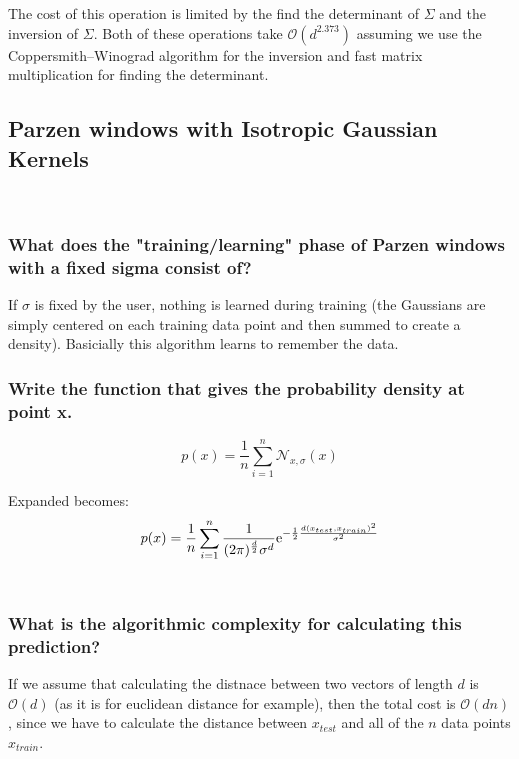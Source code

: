 \documentclass{amsart}
\theoremstyle{definition}
\theoremstyle{remark}
\numberwithin{equation}{section}
\begin{document}
The cost of this operation is limited by the find the determinant of $\Sigma$
and the inversion of $\Sigma$. Both of these operations take $\mathcal{O}(d^{2.373})$  
assuming we use the Coppersmith–Winograd algorithm for the inversion and fast
matrix multiplication for finding the determinant. \\

\subsection{Parzen windows with Isotropic Gaussian Kernels} \\

\subsubsection{What does the "training/learning" phase of Parzen windows with a
fixed sigma consist of?} 

 If $\sigma$ is fixed by the user, nothing is learned during training (the 
Gaussians are simply centered on each training data point and then summed to 
create a density). Basicially this algorithm learns to remember the data. \\

\subsubsection{Write the function that gives the probability density at point x.} 

\begin{equation}
    p(x) = \frac{1}{n}\sum_{i=1}^{n}\mathcal{N}_{x, \sigma}(x)
\end{equation}

Expanded becomes: \\

\begin{equation}
    p(x) = \frac{1}{n}\sum_{i=1}^{n} \frac{1}{(2\pi)^{\frac{d}{2}} \sigma^d} {\rm e}^{-\frac{1}{2}\frac{d(x_{test}, x_{train})^2}{\sigma^2} }
\end{equation}\\

\subsubsection{What is the algorithmic complexity for calculating this prediction?} 

If we assume that calculating the distnace between two vectors of length $d$ is 
$\mathcal{O}(d)$ (as it is for euclidean distance for example), then the total
cost is  $\mathcal{O}(dn)$, since we have to calculate the distance between 
$x_{test}$ and all of the $n$ data points $x_{train}$. \\
\end{document}
